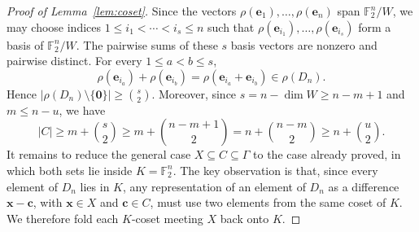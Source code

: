 \documentclass[10pt,a4paper]{amsart}
\begin{document}
\begin{proof}[Proof of Lemma~\ref{lem:coset}]
Since the vectors
\(
    \rho(\boldsymbol{e}_1),\dots,\rho(\boldsymbol{e}_n)
\)
span \(\mathbb{F}_2^n/W\), we may choose indices
\(
    1\le i_1<\cdots<i_s\le n
\)
such that
\(  \rho(\boldsymbol{e}_{i_1}),\dots,\rho(\boldsymbol{e}_{i_s})
\)
form a basis of \(\mathbb{F}_2^n/W\).  The pairwise sums of these \(s\) basis vectors are nonzero and pairwise distinct. For every \(1\le a<b\le s\),
\[
    \rho(\boldsymbol{e}_{i_a})+\rho(\boldsymbol{e}_{i_b})
    =
    \rho(\boldsymbol{e}_{i_a}+\boldsymbol{e}_{i_b})
    \in \rho(D_n).
\]
Hence
\(
    |\rho(D_n)\setminus\{\boldsymbol{0}\}|
    \ge \binom{s}{2}.
\)
Moreover, since \(s=n-\dim W\ge n-m+1\) and \(m\le n-u\), we have
\[
    |C|\ge m+\binom{s}{2}\ge m+\binom{n-m+1}{2}= n+\binom{n-m}{2}\ge n+\binom{u}{2}.
\]
It remains to reduce the general case \(X\subseteq C\subseteq \Gamma\) to the case already proved, in which both sets lie inside \(K=\mathbb{F}_2^n\). The key observation is that, since every element of \(D_n\) lies in \(K\), any representation of an element of \(D_n\) as a difference \(\boldsymbol{x}-\boldsymbol{c}\), with \(\boldsymbol{x}\in X\) and \(\boldsymbol{c}\in C\), must use two elements from the same coset of \(K\).  We therefore fold each \(K\)-coset meeting \(X\) back onto \(K\).


\end{proof}
\end{document}
